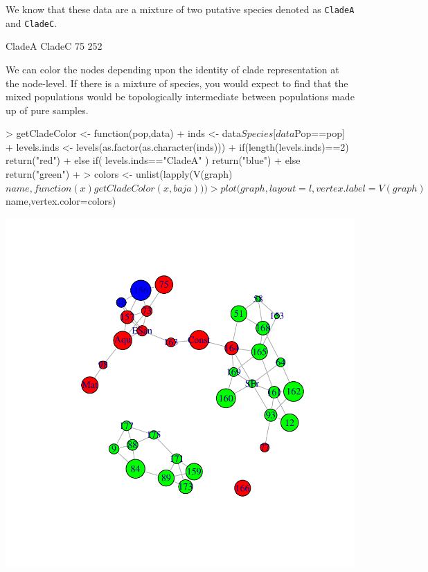\documentclass[letterpaper,twoside,openany]{book}
\begin{document}
We know that these data are a mixture of two putative species denoted as \texttt{CladeA} and \texttt{CladeC}.  

\begin{Schunk}
\begin{Soutput}
CladeA CladeC 
    75    252 
\end{Soutput}
\end{Schunk}

We can color the nodes depending upon the identity of clade representation at the node-level.  If there is a mixture of species, you would expect to find that the mixed populations would be topologically intermediate between populations made up of pure samples.

\begin{Schunk}
\begin{Sinput}
> getCladeColor <- function(pop,data) {
+ 	inds <- data$Species[data$Pop==pop]
+ 	levels.inds <- levels(as.factor(as.character(inds)))
+ 	if(length(levels.inds)==2) return("red")
+ 	else if( levels.inds=="CladeA" ) return("blue")
+ 	else return("green")
+ }
> colors <- unlist(lapply(V(graph)$name, function(x) getCladeColor(x,baja)))
> plot(graph,layout=l,vertex.label=V(graph)$name,vertex.color=colors)
\end{Sinput}
\end{Schunk}
\includegraphics{gstudio-065}
\end{document}
